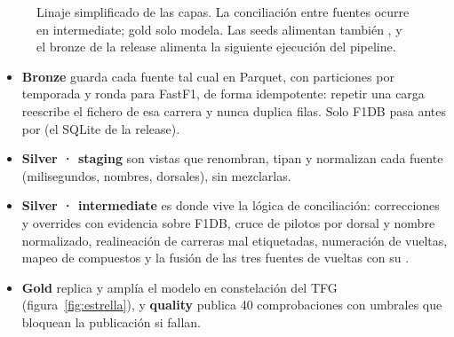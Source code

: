 \documentclass[11pt,openany]{report}
\begin{document}
\begin{figure}[ht]
\caption{Linaje simplificado de las capas. La conciliación entre fuentes ocurre en intermediate; gold
solo modela. Las seeds alimentan también , y el bronze de la release
alimenta la siguiente ejecución del pipeline.}
\label{fig:linaje}
\end{figure}

\begin{itemize}
  \item \textbf{Bronze} guarda cada fuente tal cual en Parquet, con particiones por temporada y ronda
  para FastF1, de forma idempotente: repetir una carga reescribe el fichero de esa carrera y nunca
  duplica filas. Solo F1DB pasa antes por  (el SQLite de la release).
  \item \textbf{Silver · staging} son vistas que renombran, tipan y normalizan cada fuente
  (milisegundos, nombres, dorsales), sin mezclarlas.
  \item \textbf{Silver · intermediate} es donde vive la lógica de conciliación: correcciones y
  overrides con evidencia sobre F1DB, cruce de pilotos por dorsal y nombre normalizado, realineación
  de carreras mal etiquetadas, numeración de vueltas, mapeo de compuestos y la fusión de las tres
  fuentes de vueltas con su .
  \item \textbf{Gold} replica y amplía el modelo en constelación del TFG (figura~\ref{fig:estrella}),
  y \textbf{quality} publica 40 comprobaciones con umbrales que bloquean la publicación si fallan.
\end{itemize}
\end{document}
